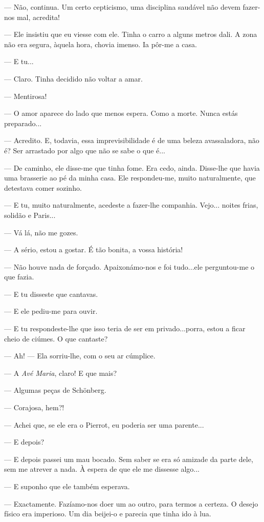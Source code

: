 --- Não, continua. Um certo cepticismo, uma disciplina saudável não devem
fazer-nos mal, acredita!

--- Ele insistiu que eu viesse com ele. Tinha o carro a alguns metros
dali. A zona não era segura, àquela hora, chovia imenso. Ia pôr-me a
casa.

--- E tu...

--- Claro. Tinha decidido não voltar a amar.

--- Mentirosa!

--- O amor aparece do lado que menos espera. Como a morte. Nunca estás
preparado...

--- Acredito. E, todavia, essa imprevisibilidade é de uma beleza
avassaladora, não é? Ser arrastado por algo que não se sabe o que é...

--- De caminho, ele disse-me que tinha fome. Era cedo, ainda. Disse-lhe
que havia uma brasserie ao pé da minha casa. Ele respondeu-me, muito
naturalmente, que detestava comer sozinho.

--- E tu, muito naturalmente, acedeste a fazer-lhe companhia. Vejo...
noites frias, solidão e Paris...

--- Vá lá, não me gozes.

--- A sério, estou a gostar. É tão bonita, a vossa história!

--- Não houve nada de forçado. Apaixonámo-nos e foi tudo...ele
perguntou-me o que fazia.

--- E tu disseste que cantavas.

--- E ele pediu-me para ouvir.

--- E tu respondeste-lhe que isso teria de ser em privado...porra, estou a
ficar cheio de ciúmes. O que cantaste?

--- Ah! --- Ela sorriu-lhe, com o seu ar cúmplice.

--- A \emph{Avé Maria}, claro! E que mais?

--- Algumas peças de Schönberg.

--- Corajosa, hem?!

--- Achei que, se ele era o Pierrot, eu poderia ser uma parente...

--- E depois?

--- E depois passei um mau bocado. Sem saber se era só amizade da parte
dele, sem me atrever a nada. À espera de que ele me dissesse algo...

--- E suponho que ele também esperava.

--- Exactamente. Fazíamo-nos doer um ao outro, para termos a certeza. O
desejo físico era imperioso. Um dia beijei-o e parecia que tinha ido à
lua.

